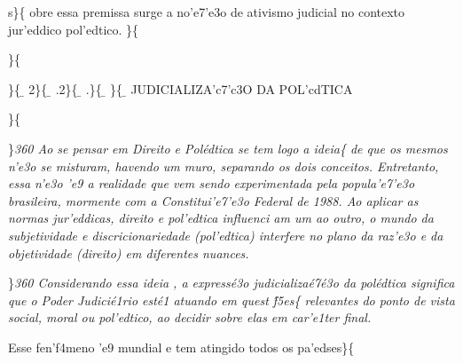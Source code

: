  s\}\{\rtlch{}  \ltrch{}
 obre essa premissa surge a no'e7'e3o de
ativismo judicial no contexto jur'eddico pol'edtico. \}\{\rtlch{}
 \ltrch{}  \par \}\{\rtlch{}  \ltrch{}
 \par \}\{\rtlch{} \ab{}
\ltrch{} \b{} 2\}\{\rtlch{}
\ab{} \ltrch{} \b{}
.2\}\{\rtlch{} \ab{} \ltrch{} \b{}
.\}\{\rtlch{} \ab{} \ltrch{}
\b{} \}\{\rtlch{} \ab{}
\ltrch{} \b{} JUDICIALIZA'c7'c3O
DA POL'cdTICA \par \}\{\rtlch{}  \ltrch{}
 \tab 
\par \}\pard \ltrpar\qj {}\sl360\widctlpar\wrapdefault\faauto{} {\rtlch{}  \ltrch{}  Ao se pensar em Direito e Pol\'edtica se tem logo a }{\rtlch{}  \ltrch{} 
 ideia}\{\rtlch{}  \ltrch{}
 de que os mesmos n'e3o se misturam,
havendo um muro, separando os dois conceitos. Entretanto, essa n'e3o 'e9
a realidade que vem sendo experimentada pela popula'e7'e3o brasileira,
mormente com a Constitui'e7'e3o Federal de 1988. Ao aplicar as normas
jur'eddicas, direito e pol'edtica influenci am um ao outro, o mundo da
subjetividade e discricionariedade (pol'edtica) interfere no plano da
raz'e3o e da objetividade (direito) em diferentes nuances.
\par \}\pard \ltrpar\qj {}\sl360\widctlpar\wrapdefault\faauto{} {\rtlch{}  \ltrch{}  \tab Considerando essa }{\rtlch{}  \ltrch{}  
ideia}{\rtlch{}  \ltrch{}  , a express\'e3o judicializa\'e7\'e3o da pol\'edtica significa que o Poder Judici\'e1rio est\'e1 atuando em quest}{\rtlch{}  \ltrch{}  \'f5es}\{\rtlch{}
 \ltrch{}  relevantes do ponto de
vista social, moral ou pol'edtico, ao decidir sobre elas em car'e1ter
final. \par \tab Esse fen'f4meno 'e9 mundial e tem atingido todos os
pa'edses\}\{\rtlch{}  \ltrch{} 
